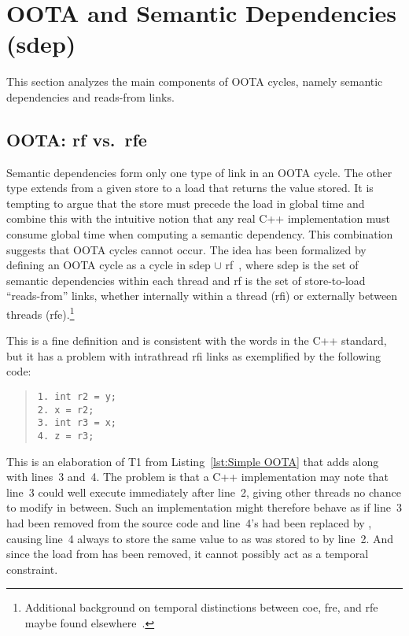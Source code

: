 \section{OOTA and Semantic Dependencies (sdep)}
\label{sec:OOTA and Semantic Dependencies (sdep)}

This section analyzes the main components of OOTA cycles, namely
semantic dependencies and reads-from links.

\subsection{OOTA: rf vs.\ rfe}
\label{sec:OOTA: rf vs. rfe}

Semantic dependencies form only one type of link in an OOTA cycle.
The other type extends from a given store to a load that returns the
value stored.
It is tempting to argue that the store must precede
the load in global time and combine this with the intuitive notion that
any real C++ implementation must consume global time when computing a
semantic dependency.
This combination suggests that OOTA cycles cannot occur.
The idea has been formalized by defining an OOTA cycle as a cycle
in sdep $\cup$ rf~\cite{PaulEMcKenney2014OOTA},
where sdep is the set of semantic dependencies within each thread and
rf is the set of store-to-load ``reads-from'' links, whether internally
within a thread (rfi) or externally between threads (rfe).\footnote{
	Additional background on temporal distinctions between coe, fre,
	and rfe maybe found elsewhere~\cite[Appendix A]{PaulEMcKenney2023P3046R2/OOTAwithoutTrying}.}

This is a fine definition and is consistent with the words in the C++
standard, but it has a problem with intrathread rfi links
as exemplified by the following code:
\begin{quote}
\begin{verbatim}
1. int r2 = y;
2. x = r2;
3. int r3 = x;
4. z = r3;
\end{verbatim}
\end{quote}
This is an elaboration of T1 from
Listing~\ref{lst:Simple OOTA}
that adds  along with lines~3 and~4.
The problem is that a C++ implementation may
note that line~3 could well execute immediately after line~2, giving
other threads no chance to modify  in between.
Such an implementation might therefore behave as if line~3 had been
removed from the source code and line~4's  had been replaced by
,
causing line~4 always to store the same value to  as was stored
to  by line~2.
And since the load from  has been removed, it cannot possibly
act as a temporal constraint.

